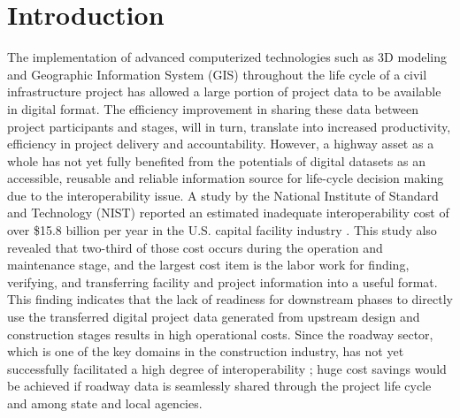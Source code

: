 \documentclass[Journal,InsideFigs, DoubleSpace]{ascelike} %
\begin{document}

\section{Introduction}%
The implementation of advanced computerized technologies such as 3D modeling and Geographic Information System (GIS) throughout the life cycle of a civil infrastructure project has allowed a large portion of project data to be available in digital format. The efficiency improvement in sharing these data between project participants and stages, will in turn, translate into increased productivity, efficiency in project delivery and accountability. However, a highway asset as a whole has not yet fully benefited from the potentials of digital datasets as an accessible, reusable and reliable information source for life-cycle decision making due to the interoperability issue. A study by the National Institute of Standard and Technology (NIST) reported an estimated inadequate interoperability cost of over \$15.8 billion per year in the U.S. capital facility industry \cite{Gallaher04}. This study also revealed that two-third of those cost occurs during the operation and maintenance stage, and the largest cost item is the labor work for finding, verifying, and transferring facility and project information into a useful format. This finding indicates that the lack of readiness for downstream phases to directly use the transferred digital project data generated from upstream design and construction stages results in high operational costs. Since the roadway sector, which is one of the key domains in the construction industry, has not yet successfully facilitated a high degree of interoperability \cite{lefler14}; huge cost savings would be achieved if roadway data is seamlessly shared through the project life cycle and among state and local agencies.
\par
\end{document}
